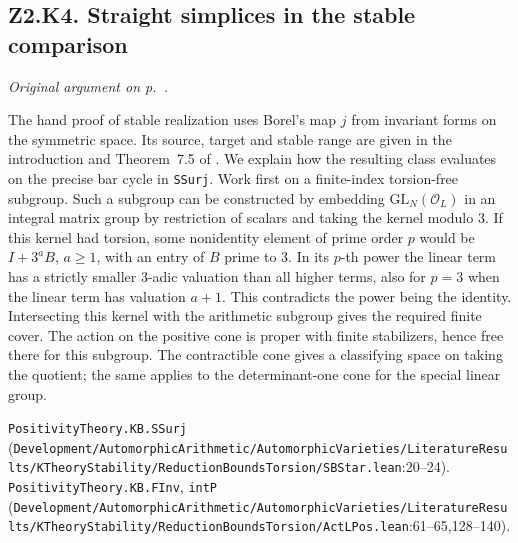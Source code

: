 \subsection{Z2.K4. Straight simplices in the stable comparison}\label{r6:review:Z2.K4} \emph{Original argument on p.~\pageref{sec:P-r5-k4}.} 

The hand proof of stable realization uses Borel's map $j$ from invariant forms on the symmetric space. Its source, target and stable range are given in the introduction and Theorem~7.5 of \cite{P-R5-Borel-stable}. We explain how the resulting class evaluates on the precise bar cycle in \nolinkurl{SSurj}. Work first on a finite-index torsion-free subgroup. Such a subgroup can be constructed by embedding $\mathrm{GL}_N(\mathcal O_L)$ in an integral matrix group by restriction of scalars and taking the kernel modulo $3$. If this kernel had torsion, some nonidentity element of prime order $p$ would be $I+3^aB$, $a\ge1$, with an entry of $B$ prime to $3$. In its $p$-th power the linear term has a strictly smaller $3$-adic valuation than all higher terms, also for $p=3$ when the linear term has valuation $a+1$. This contradicts the power being the identity. Intersecting this kernel with the arithmetic subgroup gives the required finite cover. The action on the positive cone is proper with finite stabilizers, hence free there for this subgroup. The contractible cone gives a classifying space on taking the quotient; the same applies to the determinant-one cone for the special linear group.
\par{\footnotesize \nolinkurl{PositivityTheory.KB.SSurj} (\nolinkurl{Development/AutomorphicArithmetic/AutomorphicVarieties/LiteratureResults/KTheoryStability/ReductionBoundsTorsion/SBStar.lean}\allowbreak:20--24). \nolinkurl{PositivityTheory.KB.FInv}, \nolinkurl{intP} (\nolinkurl{Development/AutomorphicArithmetic/AutomorphicVarieties/LiteratureResults/KTheoryStability/ReductionBoundsTorsion/ActLPos.lean}\allowbreak:61--65,128--140).\par}

